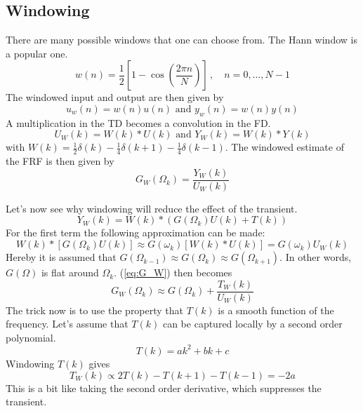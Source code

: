 \newpage
\subsection{Windowing}
There are many possible windows that one can choose from. The Hann window is a popular one.
\begin{equation}
    w(n) = \frac{1}{2} [1 - \cos(\frac{2\pi n}{N})] \,,\quad n = 0,\ldots,N-1
\end{equation}
The windowed input and output are then given by
\begin{equation*}
    u_w(n) = w(n) u(n) \text{ and } y_w(n) = w(n) y(n)
\end{equation*}
A multiplication in the TD becomes a convolution in the FD.
\begin{equation*}
    U_W(k) = W(k) * U(k) \text{ and } Y_W(k) = W(k) * Y(k) 
\end{equation*}
with $W(k) = \frac{1}{2} \delta(k) - \frac{1}{4} \delta(k+1) - \frac{1}{4} \delta(k-1)$.
The windowed estimate of the FRF is then given by
\begin{equation}
    G_W(\Omega_k) = \frac{Y_W(k)}{U_W(k)}
    \label{eq:G_W}
\end{equation}

Let's now see why windowing will reduce the effect of the transient.
\begin{equation*}
    Y_W(k) = W(k) * (G(\Omega_k) U(k) + T(k))
\end{equation*}
For the first term the following approximation can be made:
\begin{equation*}
    W(k) * [G(\Omega_k) U(k)] \approx G(\omega_k) [W(k) * U(k)] = G(\omega_k) U_W(k)
\end{equation*}
Hereby it is assumed that $G(\Omega_{k-1}) \approx G(\Omega_{k}) \approx G(\Omega_{k+1})$. In other words, $G(\Omega)$ is flat around $\Omega_k$. (\ref{eq:G_W}) then becomes
\begin{equation*}
    G_W(\Omega_k) \approx G(\Omega_k) + \frac{T_W(k)}{U_W(k)}
\end{equation*}
The trick now is to use the property that $T(k)$ is a smooth function of the frequency. Let's assume that $T(k)$ can be captured locally by a second order polynomial.
\begin{equation*}
    T(k) = a k^2 + b k + c
\end{equation*}
Windowing $T(k)$ gives
\begin{equation*}
    T_W(k) \propto 2 T(k) - T(k+1) - T(k-1) = - 2 a
\end{equation*}
This is a bit like taking the second order derivative, which suppresses the transient.

